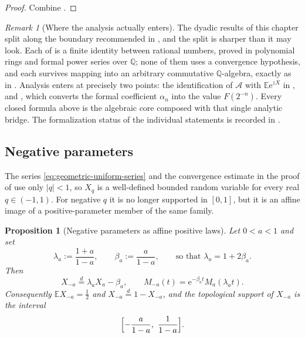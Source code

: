 \documentclass[11pt,oneside,openany]{book}
\newtheorem{proposition}[proposition]{Proposition}
\theoremstyle{definition}
\theoremstyle{remark}
\newtheorem{remark}[remark]{Remark}
\newcommand{\Q}{\mathbb Q}
\newcommand{\e}{\mathrm e}
\newcommand{\abs}[1]{\lvert #1\rvert}
\newcommand{\defeq}{\mathrel{:=}}
\begin{document}
\begin{proof}
Combine .
\end{proof}

\begin{remark}[Where the analysis actually enters]\label{rem:dyadic-algebraic-layer}
The dyadic results of this chapter split along the boundary recommended in
, and the split is sharper than it may look.  Each of
is a finite identity between rational numbers, proved in polynomial rings and formal
power series over $\Q$; none of them uses a convergence hypothesis, and each survives
mapping into an arbitrary commutative $\Q$-algebra, exactly as in
.  Analysis enters at precisely two points: the
identification of $\mathcal A$ with $\mathbb E\e^{zX}$ in
, and , which converts the
formal coefficient $\alpha_n$ into the value $F(2^{-n})$.  Every closed formula above is
the algebraic core composed with that single analytic bridge.  The formalization status
of the individual statements is recorded in .
\end{remark}


\subsection{Negative parameters}

The series \eqref{eq:geometric-uniform-series} and the convergence estimate in
the proof of  use only $\abs q<1$, so $X_q$ is
a well-defined bounded random variable for every real $q\in(-1,1)$.  For negative
$q$ it is no longer supported in $[0,1]$, but it is an affine image of a
positive-parameter member of the same family.

\begin{proposition}[Negative parameters as affine positive laws]\label{prop:qF-negative-affine}
Let $0<a<1$ and set
\begin{equation}\label{eq:qF-lambda-beta}
 \lambda_a\defeq\frac{1+a}{1-a},
 \qquad
 \beta_a\defeq\frac{a}{1-a},
 \qquad\text{so that }\lambda_a=1+2\beta_a.
\end{equation}
Then
\begin{equation}\label{eq:qF-negative-affine}
 X_{-a}\overset d=\lambda_aX_a-\beta_a,
 \qquad
 M_{-a}(t)=\e^{-\beta_at}M_a(\lambda_at).
\end{equation}
Consequently $\mathbb EX_{-a}=\tfrac12$ and $X_{-a}\overset d=1-X_{-a}$, and the
topological support of $X_{-a}$ is the interval
\begin{equation}\label{eq:qF-negative-support}
 \Bigl[-\frac a{1-a},\ \frac1{1-a}\Bigr].
\end{equation}
\end{proposition}
\end{document}
